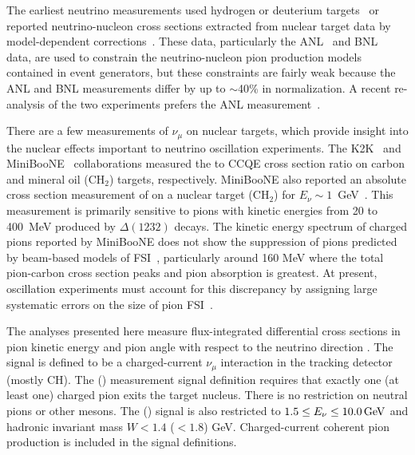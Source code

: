 The earliest neutrino \cconepiplus measurements used hydrogen or deuterium
targets~\cite{Bell:1978fnal,Radecky:1981fn,Kitagaki:1986ct,Allen:1986,WA25:1990} or reported neutrino-nucleon cross 
sections extracted from nuclear target data by model-dependent corrections~\cite{Block:1964,Budagov:1969,SKAT:1989}.  
These data, particularly the ANL~\cite{Radecky:1981fn} and BNL~\cite{Kitagaki:1986ct} data, are used to constrain the 
neutrino-nucleon pion production models contained in event generators, but these constraints are fairly weak because the ANL and BNL 
measurements differ by up to $\sim$40\% in normalization.  A recent re-analysis of the two experiments prefers the 
ANL measurement~\cite{newphil}.

There are a few measurements of $\nu_\mu$ \cconepiplus on nuclear targets, which provide insight into the nuclear effects 
important to neutrino oscillation experiments.  The K2K~\cite{K2K_piprod} and MiniBooNE~\cite{miniboone_piratio} 
collaborations measured the \cconepiplus to CCQE 
cross section ratio on carbon and mineral oil (CH$_{2}$) targets, respectively.  MiniBooNE 
also reported an absolute cross section measurement of \cconepiplus
on a nuclear target (CH$_{2}$) for $E_{\nu}\sim 1$~GeV~\cite{miniboone_piprod}.  This measurement is primarily 
sensitive to pions with kinetic energies from 20 to 400~MeV produced by $\Delta(1232)$ decays.
The kinetic energy spectrum of charged pions reported by MiniBooNE
does not show the suppression of pions predicted by beam-based models of 
FSI~\cite{gibuu-pi,valencia-pi,Rodrigues:2014jfa}, particularly around 160 MeV 
where the total pion-carbon cross section peaks and pion absorption is greatest.  At present, 
oscillation experiments must account for this discrepancy by assigning large 
systematic errors on the size of pion FSI~\cite{t2k_osc_long}.

The analyses presented here measure flux-integrated differential cross sections in pion 
kinetic energy \Tpi and pion angle with respect to the neutrino direction \thetapi.  The signal is defined to be a 
charged-current $\nu_\mu$ interaction in the \minerva tracking detector (mostly CH).  The \cconepi (\ccpi) measurement signal definition 
requires that exactly one (at least one) charged pion exits the target nucleus.  There is no restriction on neutral pions or other mesons.  The 
\cconepi (\ccpi) signal is also restricted to $1.5\le E_\nu \le \unit[10.0]{GeV}$ and hadronic invariant mass $W<1.4$ ($<1.8$) GeV.  Charged-current 
coherent pion production is included in the signal definitions. 

